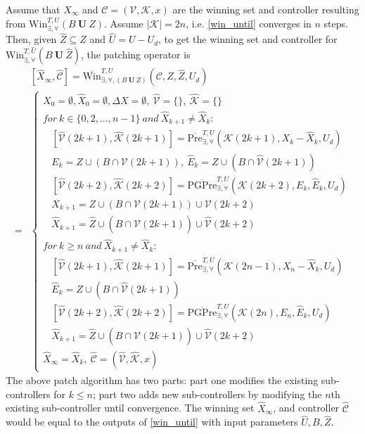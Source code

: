 Assume that $ X_\infty $ and $ \mathcal{C}=(\mathcal{V},\mathcal{K},x) $ are the winning set and controller resulting from $ \text{Win}_{\exists,\forall}^{T,U}(B\mathbf{\ U\ }Z) $. Assume $ \vert \mathcal{K}\vert = 2n $, i.e. \eqref{win_until} converges in $ n $ steps. Then, given $ \widehat{Z}\subseteq Z $ and $ \widehat{U}= U-U_d $, to get the winning set and controller for $ \text{Win}_{\exists,\forall}^{T,\widehat{U}}(B\mathbf{\ U\ }\widehat{Z}) $, the patching operator is
\begin{align}
&[\widehat{X}_\infty, \widehat{\mathcal{C}}]=\overline{\text{Win}}^{T, U}_{\exists,\forall, (B\mathbf{\ U\ }Z)}(\mathcal{C},Z,\widehat{Z}, U_d)\\
=&\begin{cases}
X_0 = \emptyset, \widehat{X}_0 = \emptyset, \Delta X = \emptyset, \ \widehat{\mathcal{V}}=\{\},\ \widehat{\mathcal{K}}=\{\}\\
for ~ k\in \{0,2,...,n-1\}\ and\ \widehat{X}_{k+1}\not=\widehat{X}_k:\\
\ \ \ \ [\widehat{\mathcal{V}}(2k+1),\widehat{\mathcal{K}}(2k+1)] = \overline{\text{Pre}}_{\exists,\forall}^{T,U}(\mathcal{K}(2k+1),X_{k}-\widehat{X}_{k}, U_d)\\
\ \ \ \ E_k = Z\cup (B\cap \mathcal{V}(2k+1)),\ \widehat{E}_k =  Z\cup (B\cap \widehat{\mathcal{V}}(2k+1))\\
\ \ \ \ [\widehat{\mathcal{V}}(2k+2),\widehat{\mathcal{K}}(2k+2)] = \overline{\text{PGPre}}_{\exists,\forall}^{T,U}(\mathcal{K}(2k+2),E_k, \widehat{E}_k,U_d)\\ 
\ \ \ \ X_{k+1} = Z\cup (B\cap \mathcal{V}(2k+1)) \cup \mathcal{V}(2k+2)\\
\ \ \ \ \widehat{X}_{k+1} =\widehat{Z}\cup (B\cap \widehat{\mathcal{V}}(2k+1)) \cup \widehat{\mathcal{V}}(2k+2)\\
for~k\geq n\ and\ \widehat{X}_{k+1}\not=\widehat{X}_k:	\\
\ \ \ \ [\widehat{\mathcal{V}}(2k+1),\widehat{\mathcal{K}}(2k+1)] = \overline{\text{Pre}}_{\exists,\forall}^{T,U}(\mathcal{K}(2n-1),X_{n}-\widehat{X}_{k}, U_d)\\
\ \ \ \ \widehat{E}_k =  Z\cup (B\cap \widehat{\mathcal{V}}(2k+1))\\
\ \ \ \ [\widehat{\mathcal{V}}(2k+2),\widehat{\mathcal{K}}(2k+2)] = \overline{\text{PGPre}}_{\exists,\forall}^{T,U}(\mathcal{K}(2n),E_n, \widehat{E}_k,U_d)\\
\ \ \ \ \widehat{X}_{k+1} =\widehat{Z}\cup (B\cap \widehat{\mathcal{V}}(2k+1)) \cup \widehat{\mathcal{V}}(2k+2)\\
\widehat{X}_\infty = \widehat{X}_k,\ \widehat{\mathcal{C}} = (\widehat{\mathcal{V}},\widehat{\mathcal{K}},x)
\end{cases} \label{patch_until}
\end{align}
The above patch algorithm has two parts: part one modifies the existing sub-controllers for $ k\leq n $; part two adds new sub-controllers by modifying the $ n $th existing sub-controller until convergence. The winning set $ \widehat{X}_{\infty} $, and controller $ \widehat{\mathcal{C}} $ would be equal to the outputs of \eqref{win_until} with input parameters $ \widehat{U},B,\widehat{Z} $. 

